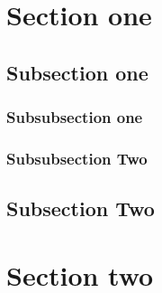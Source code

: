 \section{Section one}

\subsection{Subsection one}

\subsubsection{Subsubsection one}

\subsubsection{Subsubsection Two}

\subsection{Subsection Two}

\section{Section two}